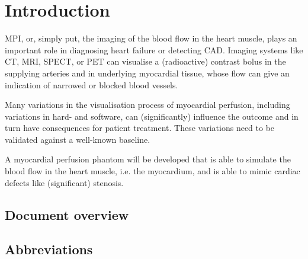 \chapter{Introduction}
\label{ch:Intro}

\Ac{MPI}, or, simply put, the imaging of the blood flow in the heart muscle, plays an important role in diagnosing heart failure or detecting \ac{CAD}. Imaging systems like \ac{CT}, \ac{MRI}, \ac{SPECT}, or \ac{PET} can visualise a (radioactive) contrast bolus in the supplying arteries and in underlying myocardial tissue, whose flow can give an indication of narrowed or blocked blood vessels.

Many variations in the visualisation process of myocardial perfusion, including variations in hard- and software, can (significantly) influence the outcome and in turn have consequences for patient treatment. These variations need to be validated against a well-known baseline.

A myocardial perfusion phantom will be developed that is able to simulate the blood flow in the heart muscle, i.e. the myocardium, and is able to mimic cardiac defects like (significant) stenosis.

\section*{Document overview}
\label{sec:doc_overview}


\section*{Abbreviations}
\begin{multicols}{2}
	\printacronyms[include-classes=abbrev, name=Abbreviations, heading=none]
\end{multicols}